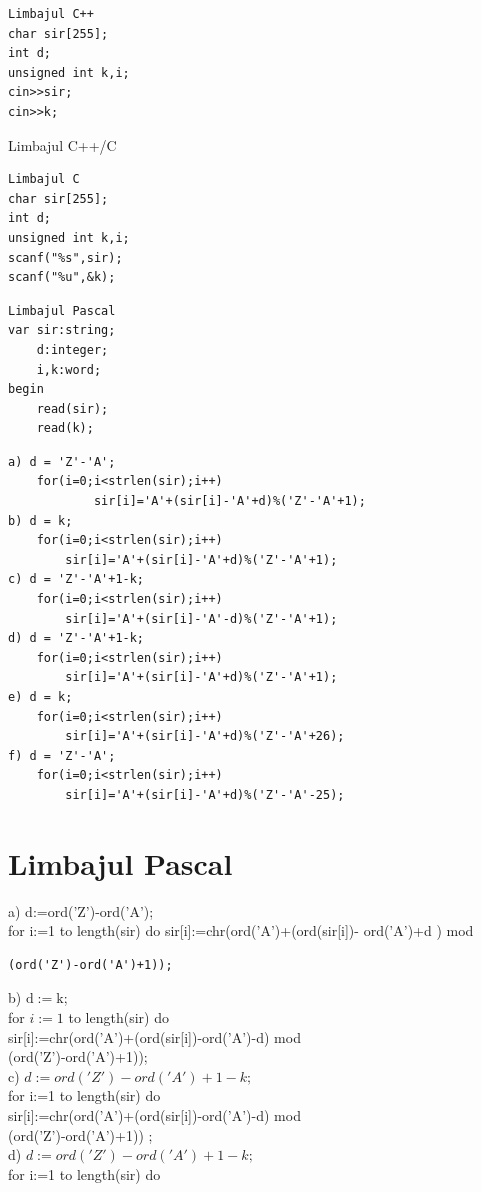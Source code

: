 \documentclass[10pt]{article}
\begin{document}
\begin{verbatim}
Limbajul C++
char sir[255];
int d;
unsigned int k,i;
cin>>sir;
cin>>k;
\end{verbatim}

Limbajul C++/C

\begin{verbatim}
Limbajul C
char sir[255];
int d;
unsigned int k,i;
scanf("%s",sir);
scanf("%u",&k);
\end{verbatim}

\begin{verbatim}
Limbajul Pascal
var sir:string;
    d:integer;
    i,k:word;
begin
    read(sir);
    read(k);
\end{verbatim}

\begin{verbatim}
a) d = 'Z'-'A';
    for(i=0;i<strlen(sir);i++)
            sir[i]='A'+(sir[i]-'A'+d)%('Z'-'A'+1);
b) d = k;
    for(i=0;i<strlen(sir);i++)
        sir[i]='A'+(sir[i]-'A'+d)%('Z'-'A'+1);
c) d = 'Z'-'A'+1-k;
    for(i=0;i<strlen(sir);i++)
        sir[i]='A'+(sir[i]-'A'-d)%('Z'-'A'+1);
d) d = 'Z'-'A'+1-k;
    for(i=0;i<strlen(sir);i++)
        sir[i]='A'+(sir[i]-'A'+d)%('Z'-'A'+1);
e) d = k;
    for(i=0;i<strlen(sir);i++)
        sir[i]='A'+(sir[i]-'A'+d)%('Z'-'A'+26);
f) d = 'Z'-'A';
    for(i=0;i<strlen(sir);i++)
        sir[i]='A'+(sir[i]-'A'+d)%('Z'-'A'-25);
\end{verbatim}

\section*{Limbajul Pascal}
a) d:=ord('Z')-ord('A');\\[0pt]
for i:=1 to length(sir) do sir[i]:=chr(ord('A')+(ord(sir[i])- ord('A')+d ) mod

\begin{verbatim}
(ord('Z')-ord('A')+1));
\end{verbatim}

b) $\mathrm{d}:=\mathrm{k}$;\\
for $i:=1$ to length(sir) do\\[0pt]
sir[i]:=chr(ord('A')+(ord(sir[i])-ord('A')-d) mod\\
(ord('Z')-ord('A')+1));\\
c) $d:=o r d(' Z ')-o r d(' A ')+1-k ;$\\
for i:=1 to length(sir) do\\[0pt]
sir[i]:=chr(ord('A')+(ord(sir[i])-ord('A')-d) mod\\
(ord('Z')-ord('A')+1)) ;\\
d) $d:=o r d(' Z ')-o r d(' A ')+1-k ;$\\
for i:=1 to length(sir) do
\end{document}
